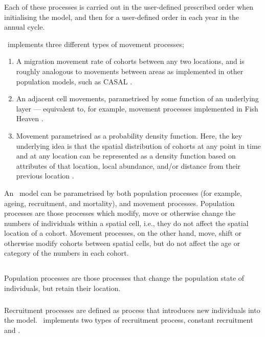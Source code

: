 Each of these processes is carried out in the user-defined prescribed order when initialising the model, and then for a user-defined order in each year in the annual cycle.

\SPM\ implements three different types of movement processes;
\begin{enumerate}
	\item  A migration movement rate of cohorts between any two locations, and is roughly analogous to movements between areas as implemented in other population models, such as CASAL \citep{1388}. 
	\item An adjacent cell movements, parametrised by some function of an underlying layer --- equivalent to, for example, movement processes implemented in Fish Heaven \citep{1136,1135}.
	\item Movement parametrised as a probability density function. Here, the key underlying idea is that the spatial distribution of cohorts at any point in time and at any location can be represented as a density function based on attributes of that location, local abundance, and/or distance from their previous location \citep{1366,1367}. 
\end{enumerate}

An \SPM\ model can be parametrised by both population processes (for example, ageing, recruitment, and mortality), and movement processes. Population processes are those processes which modify, move or otherwise change the numbers of individuals within a spatial cell, i.e., they do not affect the spatial location of a cohort. Movement processes, on the other hand, move, shift or otherwise modify cohorts between spatial cells, but do not affect the age or category of the numbers in each cohort. 

\subsection{}

Population processes are those processes that change the population state of individuals, but retain their location. 

\subsubsection{}

Recruitment processes are defined as  process that introduces new individuals into the model. \SPM\ implements two types of recruitment process, constant recruitment and  \citep{1203}. 

